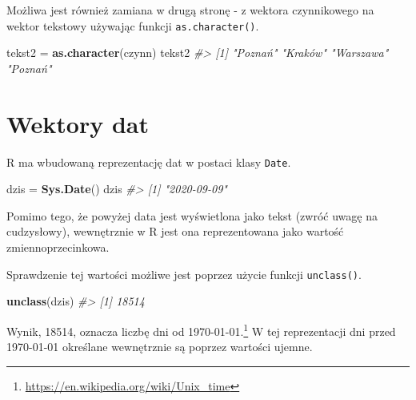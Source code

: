 \documentclass[paper=6in:9in,pagesize=pdftex,headinclude=on,footinclude=on,10pt]{scrbook}
\newenvironment{Shaded}{\begin{snugshade}}{\end{snugshade}}
\newcommand{\CommentTok}[1]{\textcolor[rgb]{0.56,0.35,0.01}{\textit{#1}}}
\newcommand{\KeywordTok}[1]{\textcolor[rgb]{0.13,0.29,0.53}{\textbf{#1}}}
\newcommand{\NormalTok}[1]{#1}
\newcommand{\StringTok}[1]{\textcolor[rgb]{0.31,0.60,0.02}{#1}}
\begin{document}
Możliwa jest również zamiana w drugą stronę - z wektora czynnikowego na wektor tekstowy używając funkcji \texttt{as.character()}.

\begin{Shaded}
\begin{Highlighting}[]
\NormalTok{tekst2 =}\StringTok{ }\KeywordTok{as.character}\NormalTok{(czynn)}
\NormalTok{tekst2}
\CommentTok{#> [1] "Poznań"   "Kraków"   "Warszawa" "Poznań"}
\end{Highlighting}
\end{Shaded}

\hypertarget{ate}{%
\section{Wektory dat}\label{ate}}

R ma wbudowaną reprezentację dat w postaci klasy \texttt{Date}.

\begin{Shaded}
\begin{Highlighting}[]
\NormalTok{dzis =}\StringTok{ }\KeywordTok{Sys.Date}\NormalTok{()}
\NormalTok{dzis}
\CommentTok{#> [1] "2020-09-09"}
\end{Highlighting}
\end{Shaded}

Pomimo tego, że powyżej data jest wyświetlona jako tekst (zwróć uwagę na cudzysłowy), wewnętrznie w R jest ona reprezentowana jako wartość zmiennoprzecinkowa.

\begin{Shaded}
\end{Shaded}

Sprawdzenie tej wartości możliwe jest poprzez użycie funkcji \texttt{unclass()}.

\begin{Shaded}
\begin{Highlighting}[]
\KeywordTok{unclass}\NormalTok{(dzis)}
\CommentTok{#> [1] 18514}
\end{Highlighting}
\end{Shaded}

Wynik, 18514, oznacza liczbę dni od 1970-01-01.\footnote{\url{https://en.wikipedia.org/wiki/Unix_time}}
W tej reprezentacji dni przed 1970-01-01 określane wewnętrznie są poprzez wartości ujemne.
\end{document}
